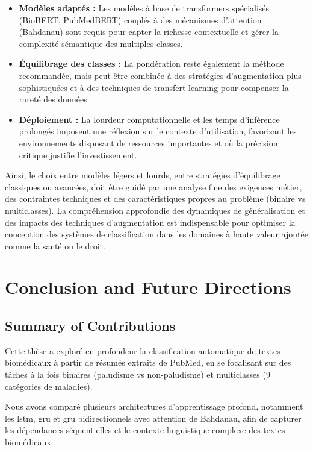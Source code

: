 \documentclass[12pt]{report}
\begin{document}
\begin{itemize}
    \item \textbf{Modèles adaptés :} Les modèles à base de transformers spécialisés (BioBERT, PubMedBERT) couplés à des mécanismes d’attention (Bahdanau) sont requis pour capter la richesse contextuelle et gérer la complexité sémantique des multiples classes.
    \item \textbf{Équilibrage des classes :} La pondération reste également la méthode recommandée, mais peut être combinée à des stratégies d’augmentation plus sophistiquées et à des techniques de transfert learning pour compenser la rareté des données.
    \item \textbf{Déploiement :} La lourdeur computationnelle et les temps d’inférence prolongés imposent une réflexion sur le contexte d’utilisation, favorisant les environnements disposant de ressources importantes et où la précision critique justifie l’investissement.
\end{itemize}

Ainsi, le choix entre modèles légers et lourds, entre stratégies d’équilibrage classiques ou avancées, doit être guidé par une analyse fine des exigences métier, des contraintes techniques et des caractéristiques propres au problème (binaire vs multiclasses). La compréhension approfondie des dynamiques de généralisation et des impacts des techniques d’augmentation est indispensable pour optimiser la conception des systèmes de classification dans les domaines à haute valeur ajoutée comme la santé ou le droit.

\chapter{Conclusion and Future Directions}

\section{Summary of Contributions}

Cette thèse a exploré en profondeur la classification automatique de textes biomédicaux à partir de résumés extraits de PubMed, en se focalisant sur des tâches à la fois binaires (paludisme vs non-paludisme) et multiclasses (9 catégories de maladies). 

Nous avons comparé plusieurs architectures d’apprentissage profond, notamment les \gls{lstm}, \gls{gru} et \gls{gru} bidirectionnels avec attention de Bahdanau, afin de capturer les dépendances séquentielles et le contexte linguistique complexe des textes biomédicaux. 
\end{document}
